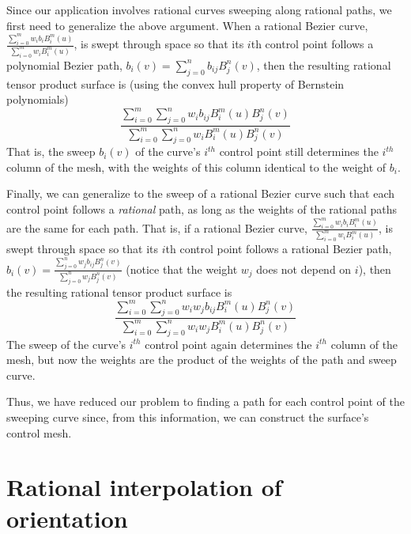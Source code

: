 Since our application involves rational curves sweeping along rational paths,
we first need to generalize the above argument.
When a rational Bezier curve,
$\frac{\sum_{i=0}^{m} w_i b_i B_i^{m}(u)}{\sum_{i=0}^{m} w_i B_i^{m}(u)}$,
is swept through space so that its $i$th control point follows
a polynomial Bezier path, 
$b_{i}(v) = \sum_{j=0}^{n} b_{ij} B_{j}^{n}(v)$,
then the resulting rational tensor product surface is
(using the convex hull property of Bernstein polynomials)
\[
\frac{\sum_{i=0}^{m} \sum_{j=0}^n w_i b_{ij} B_i^{m}(u) B_j^n(v)}
{\sum_{i=0}^{m} \sum_{j=0}^n  w_i B_i^{m}(u) B_j^n(v)}
\]
That is, the sweep $b_{i}(v)$ of the curve's $i^{th}$ control point still
determines the $i^{th}$ column of the mesh,
with the weights of this column identical to the weight of $b_i$.

Finally, we can generalize to the sweep of a rational Bezier
curve such that each control point follows a {\em rational} path,
as long as the weights of the rational paths are the same for each path.
That is, if a rational Bezier curve,
$\frac{\sum_{i=0}^{m} w_i b_i B_i^{m}(u)}{\sum_{i=0}^{m} w_i B_i^{m}(u)}$,
is swept through space so that its $i$th control point follows
a rational Bezier path, 
$b_i(v) = \frac{\sum_{j=0}^{n} w_j b_{ij} B_{j}^{n}(v)}
{\sum_{j=0}^{n} w_j B_{j}^{n}(v)}$
(notice that the weight $w_j$ does not depend on $i$),
then the resulting rational tensor product surface is
\begin{equation}
\label{eq:ratrat}
\frac{\sum_{i=0}^{m} \sum_{j=0}^n w_i w_j b_{ij} B_i^{m}(u) B_j^n(v)}
{\sum_{i=0}^{m} \sum_{j=0}^n w_i w_j B_i^{m}(u) B_j^n(v)}
\end{equation}
The sweep of the curve's $i^{th}$ control point again determines the
$i^{th}$ column of the mesh,
but now the weights are the product of the weights of the path and sweep curve.

Thus, we have reduced our problem to finding a path for each control point of
the sweeping curve since, from this information, 
we can construct the surface's control mesh.

\section{Rational interpolation of orientation}
\label{sec:orient-interp}

